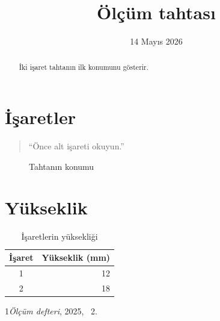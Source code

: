 \documentclass{article}
\begin{document}
\title{Ölçüm tahtası}\author{}\date{14 Mayıs 2026}\maketitle
\begin{abstract}İki işaret tahtanın ilk konumunu gösterir.\end{abstract}
\tableofcontents
\section{İşaretler}\begin{quote}“Önce alt işareti okuyun.”\end{quote}
\begin{figure}[ht]\centering\fbox{\rule{0pt}{8mm}\rule{33mm}{0pt}}\caption{Tahtanın konumu}\end{figure}
\section{Yükseklik}
\begin{table}[ht]\centering\begin{tabular}{cr}İşaret&Yükseklik (mm)\\\hline 1&12\\2&18\end{tabular}\caption{İşaretlerin yüksekliği}\end{table}
\begin{thebibliography}{1}\emph{Ölçüm defteri}, 2025, \chaptername~2.\end{thebibliography}
\end{document}
